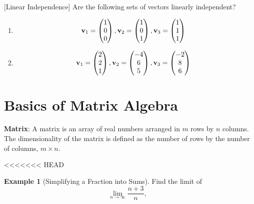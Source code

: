 \documentclass[]{book}
\theoremstyle{definition}
\theoremstyle{definition}
\newtheorem{example}{Example}[chapter]
\theoremstyle{definition}
\theoremstyle{remark}
\begin{document}
[Linear Independence]
\protect\hypertarget{exr:linearindep1}{}{\label{exr:linearindep1} {} }
Are the following sets of vectors linearly independent?

\begin{enumerate}
\def\labelenumi{\arabic{enumi}.}
\item
  \[{\bf v}_1 = \begin{pmatrix} 1 \\ 0 \\ 0 \end{pmatrix} , {\bf v}_2 = \begin{pmatrix} 1 \\ 0 \\ 1 \end{pmatrix} , {\bf v}_3 = \begin{pmatrix} 1 \\ 1 \\ 1 \end{pmatrix} \]
\item
  \[{\bf v}_1 = \begin{pmatrix} 2 \\ 2 \\ 1 \end{pmatrix} , {\bf v}_2 = \begin{pmatrix} -4 \\ 6 \\ 5 \end{pmatrix} , {\bf v}_3 = \begin{pmatrix} -2 \\ 8 \\ 6 \end{pmatrix} \]
\end{enumerate}

\hypertarget{matrixbasics}{%
\section{Basics of Matrix Algebra}\label{matrixbasics}}

\textbf{Matrix}: A matrix is an array of real numbers arranged in \(m\) rows by \(n\) columns. The dimensionality of the matrix is defined as the number of rows by the number of columns, \(m \times n\).

<<<<<<< HEAD
\begin{example}[Simplifying a Fraction into Sums]
\protect\hypertarget{exm:unnamed-chunk-3}{}{\label{exm:unnamed-chunk-3} {} }Find the limit of
\[\lim_{n\to \infty} \frac{n + 3}{n},\]
\end{example}
\end{document}
